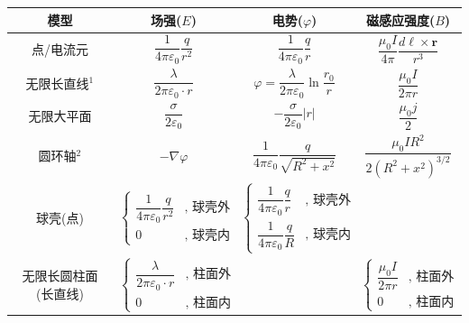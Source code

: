 \documentclass[UTF8]{ctexart}
\begin{document}
\renewcommand{\arraystretch}{2.5}
\begin{table}[H]
\centering
\makegapedcells
\begin{tabular}{c|c|c|c}
    \hline
    模型          & 场强($ E $) & 电势($ \varphi $) & 磁感应强度($ B $) \\
    \hline 
    点/电流元       &  $ \dfrac{1}{4 \pi \varepsilon_0} \dfrac{q}{r^2} $  &  $ \dfrac{1}{4 \pi \varepsilon_0} \dfrac{q}{r} $  &   $ \dfrac{\mu_0 I}{4\pi} \dfrac{d\boldsymbol{\ell} \times \mathbf r}{r^3} $    \\
    
    \hline
    无限长直线$ ^\text{1} $       &  $ \dfrac{\lambda}{2 \pi \varepsilon_0 \cdot r} $  &  $ \varphi = \dfrac{\lambda}{2 \pi \varepsilon_0} \ln \dfrac{r_0}{r} $  &  $ \dfrac{\mu_0 I}{2 \pi r} $     \\

    \hline
    无限大平面       &  $ \dfrac{\sigma}{2\varepsilon_0} $  &  $ -\dfrac{\sigma}{2\varepsilon_0}|r| $  & $ \dfrac{\mu_0 j}{2}  $      \\
    
    \hline
    圆环轴$ ^{\text{2}} $         &  $ -\nabla\varphi $  &  $ \dfrac{1}{4 \pi \varepsilon_0} \dfrac{q}{\sqrt{R^2 + x^2}} $  &  $ \dfrac{\mu_0 I R^2}{2(R^2 + x^2)^{3/2}} $     \\
    
    \hline
    球壳(点)       &  $ \begin{cases}
        \dfrac{1 }{4 \pi \varepsilon_0} \dfrac{q}{r^2} &,\text{ 球壳外} \\
        0 &,\text{ 球壳内}
    \end{cases} $  & $ \begin{cases}
        \dfrac{1 }{4 \pi \varepsilon_0} \dfrac{q}{r} &,\text{ 球壳外}\\
        \dfrac{1 }{4 \pi \varepsilon_0} \dfrac{q}{R} &,\text{ 球壳内}
    \end{cases} $   &       \\
    
    \hline
    无限长圆柱面(长直线) &  $ \begin{cases}
        \dfrac{\lambda}{2 \pi \varepsilon_0 \cdot r} &,\text{ 柱面外}\\
        0 &,\text{ 柱面内}
    \end{cases} $  &    &   $ \begin{cases}
        \dfrac{\mu_0 I}{2 \pi r} &,\text{ 柱面外}\\
        0 &,\text{ 柱面内}
    \end{cases} $    \\


\end{tabular}
\end{table}
\end{document}
